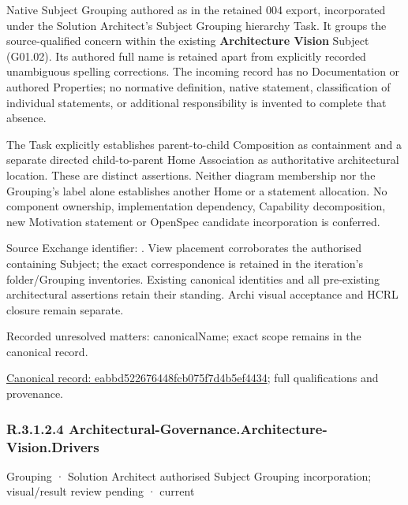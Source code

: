 Native Subject Grouping authored as \texttt{} in the retained 004 export,
incorporated under the Solution Architect's Subject Grouping hierarchy Task.
It groups the source-qualified \texttt{} concern within
the existing \textbf{Architecture Vision} Subject (G01.02). Its authored full name
is retained apart from explicitly recorded unambiguous spelling corrections.
The incoming record has no Documentation or authored Properties; no normative
definition, native statement, classification of individual statements, or
additional responsibility is invented to complete that absence.



The Task explicitly establishes parent-to-child Composition as containment and
a separate directed child-to-parent Home Association as authoritative architectural
location. These are distinct assertions. Neither diagram membership nor the
Grouping's label alone establishes another Home or a statement allocation.
No component ownership, implementation dependency, Capability decomposition,
new Motivation statement or OpenSpec candidate incorporation is conferred.



Source Exchange identifier: \texttt{}. View placement corroborates
the authorised containing Subject; the exact correspondence is retained in the
iteration's folder/Grouping inventories. Existing canonical identities and all
pre-existing architectural assertions retain their standing. Archi visual
acceptance and HCRL closure remain separate.


{\small Recorded unresolved matters: canonicalName; exact scope remains in the canonical record.}\par
{\footnotesize \href{../../../../continuum/grouping/eabbd522676448fcb075f7d4b5ef4434.md}{Canonical record: eabbd522676448fcb075f7d4b5ef4434}; full qualifications and provenance.}\par
\subsubsection*{R.3.1.2.4 Architectural-Governance.Architecture-Vision.Drivers}
\label{navigation:R.3.1.2.4}

\label{element:dc8500b4e7eb4923884f54db99d10a88}
{\small Grouping · Solution Architect authorised Subject Grouping incorporation; visual/result review pending · current}\par

